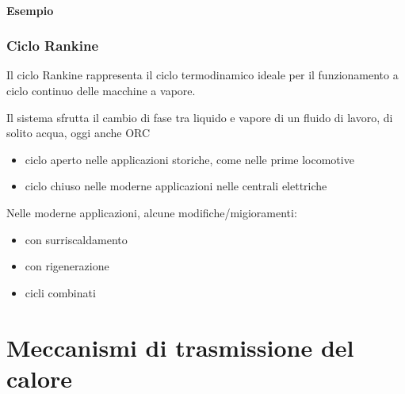 \documentclass[letterpaper,10pt,italian]{jupyterBook}
\begin{document}
\subsubsection{Esempio}
\label{\detokenize{ch/thermodynamics/heat-engine-joule-brayton:esempio}}
\sphinxAtStartPar
{}

\sphinxstepscope


\subsection{Ciclo Rankine}
\label{\detokenize{ch/thermodynamics/heat-engine-rankine:ciclo-rankine}}\label{\detokenize{ch/thermodynamics/heat-engine-rankine:physics-hs-thermodynamics-heat-engine-rankine}}\label{\detokenize{ch/thermodynamics/heat-engine-rankine::doc}}
\sphinxAtStartPar
Il ciclo Rankine rappresenta il ciclo termodinamico ideale per il funzionamento a ciclo continuo delle macchine a vapore.

\sphinxAtStartPar
Il sistema sfrutta il cambio di fase tra liquido e vapore di un fluido di lavoro, di solito acqua, oggi anche ORC
\begin{itemize}
\item {} 
\sphinxAtStartPar
ciclo aperto nelle applicazioni storiche, come nelle prime locomotive

\item {} 
\sphinxAtStartPar
ciclo chiuso nelle moderne applicazioni nelle centrali elettriche

\end{itemize}

\sphinxAtStartPar
Nelle moderne applicazioni, alcune modifiche/migioramenti:
\begin{itemize}
\item {} 
\sphinxAtStartPar
con surriscaldamento

\item {} 
\sphinxAtStartPar
con rigenerazione

\item {} 
\sphinxAtStartPar
cicli combinati

\end{itemize}

\sphinxstepscope


\chapter{Meccanismi di trasmissione del calore}
\label{\detokenize{ch/thermodynamics/heat-transmission:meccanismi-di-trasmissione-del-calore}}\label{\detokenize{ch/thermodynamics/heat-transmission:physics-hs-thermodynamics-heat-transmission}}\label{\detokenize{ch/thermodynamics/heat-transmission::doc}}
\sphinxstepscope
\end{document}
